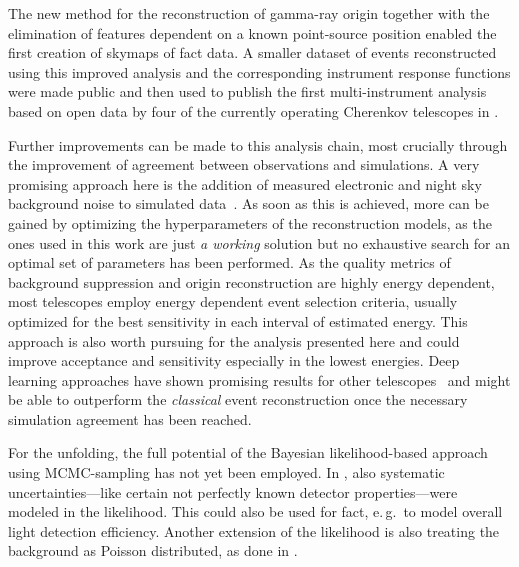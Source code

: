 The new method for the reconstruction of gamma-ray origin together
with the elimination of features dependent on a known point-source position
enabled the first creation of skymaps of \gls{fact} data.
A smaller dataset of events reconstructed using this improved analysis and
the corresponding instrument response functions were made public and then used to publish the first multi-instrument
analysis based on open data by four of the currently operating Cherenkov telescopes
in \cite{open-crab}.

Further improvements can be made to this analysis chain, most crucially 
through the improvement of agreement between observations and simulations.
A very promising approach here is the addition of measured electronic and night sky background
noise to simulated data~\cite{phd-buss,master-bulinski}.
As soon as this is achieved, more can be gained by optimizing the
hyperparameters of the reconstruction models,
as the ones used in this work are just \emph{a working} solution but no exhaustive
search for an optimal set of parameters has been performed.
As the quality metrics of background suppression and origin reconstruction are
highly energy dependent, most telescopes employ energy dependent event selection
criteria, usually optimized for the best sensitivity in each interval of estimated energy.
This approach is also worth pursuing for the analysis presented here and could
improve acceptance and sensitivity especially in the lowest energies.
Deep learning approaches have shown promising results for other telescopes~\cite{hess_deep_learning}
and might be able to outperform the \emph{classical}
event reconstruction once the necessary simulation agreement has been reached.

For the unfolding, the full potential of the Bayesian likelihood-based approach 
using MCMC-sampling has not yet been employed.
In \cite{phd-boerner}, also systematic uncertainties—like certain not perfectly
known detector properties—were modeled in the likelihood.
This could also be used for \gls{fact}, e.\,g.\ to model overall light detection efficiency.
Another extension of the likelihood is also treating the background as Poisson distributed, as done in \cite{phd-bruegge}.

